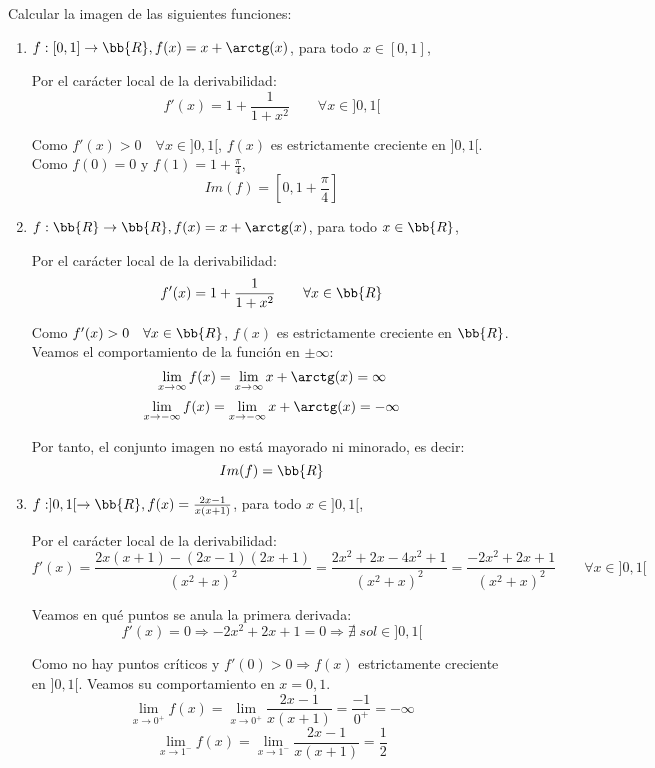 \begin{ejercicio}
    Calcular la imagen de las siguientes funciones:
    \begin{enumerate}
        \item $f:[0,1]\to \bb{R}, f(x)=x+\arctg(x)$, para todo $x\in[0,1]$,

        Por el carácter local de la derivabilidad:
        $$f'(x)=1+\frac{1}{1+x^2} \qquad \forall x \in ]0,1[$$

        Como $f'(x)>0 \quad \forall x \in ]0,1[$, $f(x)$ es estrictamente creciente en $]0,1[$. Como $f(0)=0$ y $f(1)=1+\frac{\pi}{4}$,
        $$Im(f)=\left[0,1+\frac{\pi}{4}\right]$$

        \item $f:\bb{R}\to \bb{R}, f(x)=x+\arctg(x)$, para todo $x\in \bb{R}$,

        Por el carácter local de la derivabilidad:
        $$f'(x)=1+\frac{1}{1+x^2} \qquad \forall x \in \bb{R}$$

        Como $f'(x)>0 \quad \forall x \in \bb{R}$, $f(x)$ es estrictamente creciente en $\bb{R}$. Veamos el comportamiento de la función en $\pm \infty$:
        \begin{equation*}
            \lim_{x\to \infty} f(x) = \lim_{x\to \infty} x+\arctg(x) = \infty
        \end{equation*}
        \begin{equation*}
            \lim_{x\to -\infty} f(x) = \lim_{x\to -\infty} x+\arctg(x) = -\infty
        \end{equation*}
        
        Por tanto, el conjunto imagen no está mayorado ni minorado, es decir:
        $$Im(f)=\bb{R}$$

        \item $f:]0,1[\to \bb{R}, f(x)=\frac{2x-1}{x(x+1)}$, para todo $x\in]0,1[$,

        Por el carácter local de la derivabilidad:
        $$f'(x)=\frac{2x(x+1)-(2x-1)(2x+1)}{(x^2+x)^2} = \frac{2x^2+2x-4x^2+1}{(x^2+x)^2} = \frac{-2x^2+2x+1}{(x^2+x)^2} \qquad \forall x \in ]0,1[$$

        Veamos en qué puntos se anula la primera derivada:
        \begin{equation*}
            f'(x)=0 \Longrightarrow -2x^2+2x+1=0 \Longrightarrow \nexists \;sol \in ]0,1[
        \end{equation*}
        
        Como no hay puntos críticos y $f'(0)>0 \Longrightarrow f(x)$ estrictamente creciente en $]0,1[$. Veamos su comportamiento en $x=0,1$.
        \begin{equation*}
            \lim_{x \to 0^+} f(x) = \lim_{x \to 0^+} \frac{2x-1}{x(x+1)} = \frac{-1}{0^+} = -\infty
        \end{equation*}
        \begin{equation*}
            \lim_{x \to 1^-} f(x) = \lim_{x \to 1^-} \frac{2x-1}{x(x+1)} = \frac{1}{2}
        \end{equation*}


\end{enumerate}
\end{ejercicio}
